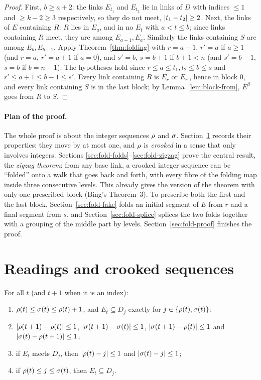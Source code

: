 \begin{proof}
First, $b\ge a+2$: the links $E_{t_1}$ and $E_{t_2}$ lie in links of $D$ with indices $\le1$ and $\ge k-2\ge3$
respectively, so they do not meet, $\left\lvert t_1-t_2\right\rvert\ge2$. Next, the links of $E$ containing $R$: $R$ lies in $E_a$, and in
no $E_t$ with $a<t\le b$; since links containing $R$ meet, they are among $E_{a-1},E_a$. Similarly the links containing
$S$ are among $E_b,E_{b+1}$. Apply Theorem~\ref{thm:folding} with $r=a-1$, $r'=a$ if $a\ge1$ (and $r=a$, $r'=a+1$ if
$a=0$), and $s'=b$, $s=b+1$ if $b+1<n$ (and $s'=b-1$, $s=b$ if $b=n-1$). The hypotheses hold since $r\le a\le t_1,t_2\le
b\le s$ and $r'\le a+1\le b-1\le s'$. Every link containing $R$ is $E_r$ or $E_{r'}$, hence in block $0$, and every link
containing $S$ is in the last block; by Lemma~\ref{lem:block-from}, $E^\beta$ goes from $R$ to $S$.
\end{proof}


\paragraph{Plan of the proof.}
The whole proof is about the integer sequences $\rho$ and $\sigma$. Section~\ref{sec:fold-readings} records their
properties: they move by at most one, and $\rho$ is \emph{crooked} in a sense that only involves integers. Sections
\ref{sec:fold-folds}--\ref{sec:fold-zigzag} prove the central result, the \emph{zigzag theorem}: from any base link, a
crooked integer sequence can be ``folded'' onto a walk that goes back and forth, with every fibre of the folding map
inside three consecutive levels. This already gives the version of the theorem with only one prescribed block (Bing's
Theorem~3). To prescribe both the first and the last block, Section~\ref{sec:fold-fake} folds an initial segment of $E$
from $r$ and a final segment from $s$, and Section~\ref{sec:fold-splice} splices the two folds together with a grouping
of the middle part by levels. Section~\ref{sec:fold-proof} finishes the proof.

\section{Readings and crooked sequences}\label{sec:fold-readings}

\begin{lemma}\label{lem:readings}
For all $t$ (and $t+1$ when it is an index):
\begin{enumerate}[label=(\alph*)]
\item $\rho(t)\le\sigma(t)\le\rho(t)+1$, and $E_t\subseteq D_j$ exactly for $j\in\left\{ \rho(t),\sigma(t) \right\}$;
\item $\left\lvert \rho(t+1)-\rho(t)\right\rvert\le1$, $\left\lvert \sigma(t+1)-\sigma(t)\right\rvert\le1$, $\left\lvert \sigma(t+1)-\rho(t)\right\rvert\le1$ and $\left\lvert \sigma(t)-\rho(t+1)\right\rvert\le 1$;
\item if $E_t$ meets $D_j$, then $\left\lvert \rho(t)-j\right\rvert\le1$ and $\left\lvert \sigma(t)-j\right\rvert\le1$;
\item if $\rho(t)\le j\le\sigma(t)$, then $E_t\subseteq D_j$.
\end{enumerate}
\end{lemma}

